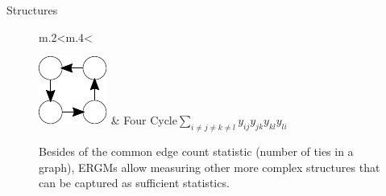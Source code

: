 \documentclass[10pt,ignorenonframetext,aspectratio=169,]{beamer}
\begin{document}
\begin{frame}{Structures}
\begin{figure}
\begin{tabular}{m{.2\linewidth}<\centering m{.4\linewidth}<\raggedright}
\includegraphics[width=.45\linewidth]{terms/fourcycle.pdf} & Four Cycle\linebreak[4]$\sum_{i\neq j \neq k \neq l}y_{ij}y_{jk}y_{kl}y_{li}$  \\
\bottomrule
\end{tabular}
\caption{\label{fig:ergm-structs}Besides of the common edge count statistic (number of ties in a graph), ERGMs allow measuring other more complex structures that can be captured as sufficient statistics. }
\end{figure}

\end{frame}
\end{document}
